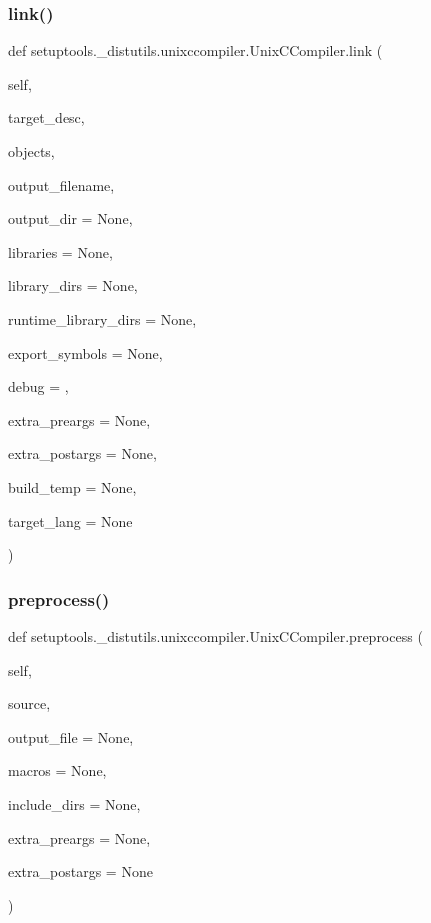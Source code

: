 \subsubsection{\texorpdfstring{link()}{link()}}
{\footnotesize\ttfamily def setuptools.\+\_\+distutils.\+unixccompiler.\+Unix\+C\+Compiler.\+link (\begin{DoxyParamCaption}\item[{}]{self,  }\item[{}]{target\+\_\+desc,  }\item[{}]{objects,  }\item[{}]{output\+\_\+filename,  }\item[{}]{output\+\_\+dir = {\ttfamily None},  }\item[{}]{libraries = {\ttfamily None},  }\item[{}]{library\+\_\+dirs = {\ttfamily None},  }\item[{}]{runtime\+\_\+library\+\_\+dirs = {\ttfamily None},  }\item[{}]{export\+\_\+symbols = {\ttfamily None},  }\item[{}]{debug = {},  }\item[{}]{extra\+\_\+preargs = {\ttfamily None},  }\item[{}]{extra\+\_\+postargs = {\ttfamily None},  }\item[{}]{build\+\_\+temp = {\ttfamily None},  }\item[{}]{target\+\_\+lang = {\ttfamily None} }\end{DoxyParamCaption})}

\mbox{\label{classsetuptools_1_1__distutils_1_1unixccompiler_1_1UnixCCompiler_abcad2a3a14b082195203df6cdee75790}} 
\subsubsection{\texorpdfstring{preprocess()}{preprocess()}}
{\footnotesize\ttfamily def setuptools.\+\_\+distutils.\+unixccompiler.\+Unix\+C\+Compiler.\+preprocess (\begin{DoxyParamCaption}\item[{}]{self,  }\item[{}]{source,  }\item[{}]{output\+\_\+file = {\ttfamily None},  }\item[{}]{macros = {\ttfamily None},  }\item[{}]{include\+\_\+dirs = {\ttfamily None},  }\item[{}]{extra\+\_\+preargs = {\ttfamily None},  }\item[{}]{extra\+\_\+postargs = {\ttfamily None} }\end{DoxyParamCaption})}

